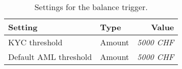\begin{table}[h!]
  \caption{Settings for the balance trigger.}
  \begin{tabular}{l|l|r}
    {\bf Setting}          & {\bf Type}         & {\bf Value} \\ \hline \hline
    KYC threshold          & Amount             & {\em 5000 CHF} \\
    Default AML threshold  & Amount             & {\em 5000 CHF} \\
  \end{tabular}
\end{table}
